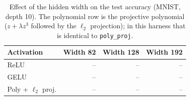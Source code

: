 \begin{table}[t]
\centering
\caption{Effect of the hidden width on the test accuracy (MNIST, depth 10). The polynomial row is the projective polynomial ($z+\lambda z^{3}$ followed by the $\ell_2$ projection); in this harness that is identical to \texttt{poly\_proj}.}
\label{tab:width}
\small
\begin{tabular}{lrrr}
\toprule
Activation & Width 82 & Width 128 & Width 192 \\
\midrule
ReLU & -- & -- & -- \\
GELU & -- & -- & -- \\
Poly + $\ell_2$ proj. & -- & -- & -- \\
\bottomrule
\end{tabular}
\end{table}